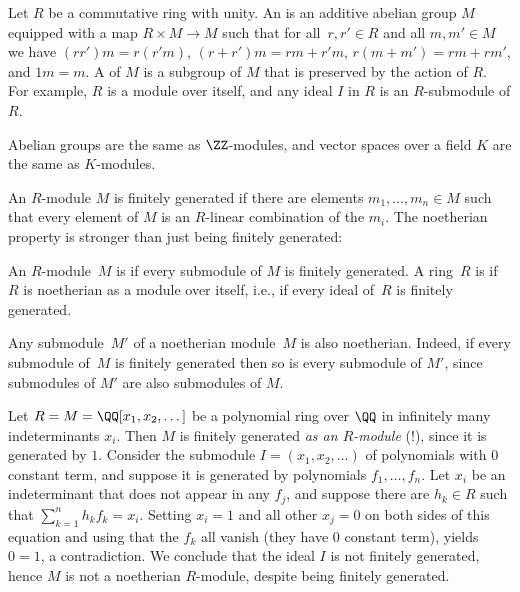 Let $R$ be a commutative ring with unity.
An  is an additive abelian
group $M$ equipped with a map $R\times M \to M$ such that for all~$r,
r'\in R$ and all $m, m'\in M$ we have $(r r')m = r(r' m )$, $(r + r')m
= rm + r' m$, $r(m+m') = rm + rm'$, and $1m=m$.  A  of $M$
is a subgroup of $M$ that is preserved by the action of $R$.
For example, $R$ is a module over itself, and
any ideal $I$ in $R$ is an $R$-submodule of $R$.

\begin{example}
  Abelian groups are the same as $\ZZ$-modules, and vector spaces
  over a field $K$ are the same as $K$-modules.
\end{example}

An $R$-module $M$ is finitely generated if there are elements $m_1, \dots, m_n\in M$
such that every element of $M$ is an $R$-linear combination of the $m_i$.  The noetherian
property is stronger than just being finitely generated:

\begin{definition}[Noetherian]
  An $R$-module~$M$ is  if every
  submodule of $M$ is finitely generated.  A ring~$R$ is
   if~$R$ is noetherian as a module over itself,
  i.e., if every ideal of~$R$ is finitely generated.
\end{definition}

Any submodule~$M'$ of a noetherian module~$M$ is also noetherian.
Indeed, if every submodule of~$M$ is finitely generated then so is
every submodule of $M'$, since submodules of $M'$ are also submodules
of $M$.

\begin{example}
  Let $R=M=\QQ[x_1,x_2,\dots]$ be a polynomial ring over $\QQ$ in
  infinitely many indeterminants $x_i$.  Then $M$ is finitely generated
  {\em as an $R$-module} (!), since it is generated by $1$.  Consider
  the submodule $I=(x_1,x_2,\dots)$ of polynomials with $0$ constant
  term, and suppose it is generated by polynomials $f_1, \dots, f_n$.
  Let $x_i$ be an indeterminant that does not appear in any $f_j$, and
  suppose there are $h_k\in R$ such that $\sum_{k=1}^n h_k f_k = x_i$.
  Setting $x_i=1$ and all other $x_j=0$ on both sides of this equation
  and using that the $f_k$ all vanish (they have 0 constant term),
  yields $0=1$, a contradiction.  We conclude that the ideal $I$ is not
  finitely generated, hence $M$ is not a noetherian $R$-module, despite
  being finitely generated.
\end{example}

